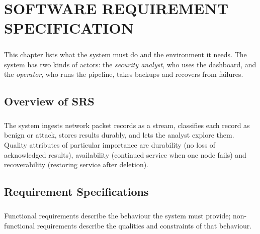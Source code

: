 \chapter{SOFTWARE REQUIREMENT SPECIFICATION}

\paragraph{}
This chapter lists what the system must do and the environment it needs. The system has two kinds of actors: the \emph{security analyst}, who uses the dashboard, and the \emph{operator}, who runs the pipeline, takes backups and recovers from failures.

\section{Overview of SRS}
\paragraph{}
The system ingests network packet records as a stream, classifies each record as benign or attack, stores results durably, and lets the analyst explore them. Quality attributes of particular importance are durability (no loss of acknowledged results), availability (continued service when one node fails) and recoverability (restoring service after deletion).

\section{Requirement Specifications}
\paragraph{}
Functional requirements describe the behaviour the system must provide; non-functional requirements describe the qualities and constraints of that behaviour.

